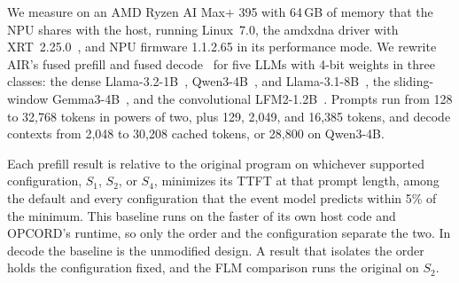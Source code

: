 We measure on an AMD Ryzen\texttrademark{} AI Max+ 395 with 64\,GB of memory that the NPU shares with the host, running Linux~7.0, the amdxdna driver with XRT~2.25.0~\citep{xdna-driver,xrt-repo}, and NPU firmware 1.1.2.65 in its performance mode.
We rewrite AIR's fused prefill and fused decode~\citep{wang2026mlirair} for five LLMs with 4-bit weights in three classes: the dense Llama-3.2-1B~\citep{meta2024llama32}, Qwen3-4B~\citep{qwen2025qwen3}, and Llama-3.1-8B~\citep{meta2024llama31}, the sliding-window Gemma3-4B~\citep{farabet2025gemma3}, and the convolutional LFM2-1.2B~\citep{liquidai2025lfm2}.
Prompts run from 128 to 32{,}768 tokens in powers of two, plus 129, 2{,}049, and 16{,}385 tokens, and decode contexts from 2{,}048 to 30{,}208 cached tokens, or 28{,}800 on Qwen3-4B.

Each prefill result is relative to the original program on whichever supported configuration, $S_1$, $S_2$, or $S_4$, minimizes its TTFT at that prompt length, among the default and every configuration that the event model predicts within 5\% of the minimum.
This baseline runs on the faster of its own host code and OPCORD's runtime, so only the order and the configuration separate the two.
In decode the baseline is the unmodified design.
A result that isolates the order holds the configuration fixed, and the FLM comparison runs the original on $S_2$.

